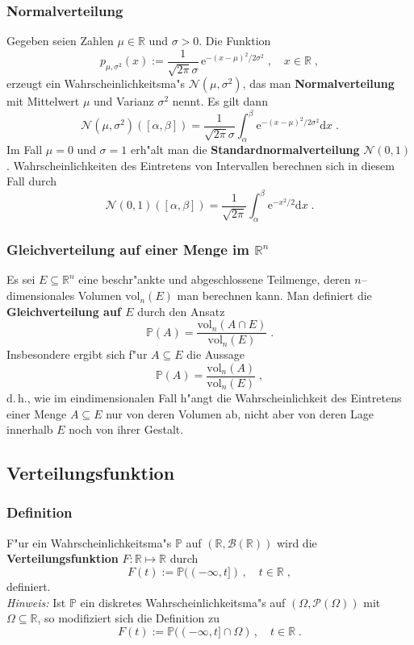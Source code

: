 \documentclass[ngerman,draft,parskip=half,twoside]{scrartcl}
\newcommand*{\R}{\mathbb{R}}      %
\newcommand*{\BorelM}{\mathcal{B}}  %
\newcommand*{\PotM}{\mathcal{P}}    %
\newcommand*{\WKM}{\mathbb{P}}      %
\begin{document}
\subsubsection{Normalverteilung}
Gegeben seien Zahlen $\mu\in\R$ und $\sigma>0$. Die
Funktion
$$
p_{\mu,\sigma^2}(x):= \frac{1}{\sqrt{2\pi}\sigma}\,\mathrm e^{-(x-\mu)^2/2\sigma^2}\;,
\quad x\in\R\;,
$$
erzeugt ein Wahrscheinlichkeitsma"s $\mathcal N(\mu,\sigma^2)$, das
man \textbf{Normalverteilung} mit Mittelwert $\mu$ und Varianz $\sigma^2$ nennt. Es gilt dann
$$
\mathcal N(\mu,\sigma^2)([\alpha,\beta])=\frac{1}{\sqrt{2\pi}\sigma}
\int_\alpha^\beta \mathrm e^{-(x-\mu)^2/2\sigma^2}\mathrm dx\;.
$$
Im Fall $\mu=0$ und $\sigma=1$ erh"alt man die \textbf{Standardnormalverteilung}
$\mathcal N(0,1)$ . Wahrscheinlichkeiten des Eintretens von Intervallen berechnen sich in diesem Fall durch
$$
\mathcal N(0,1)([\alpha,\beta])=\frac{1}{\sqrt{2\pi}}
\int_\alpha^\beta \mathrm e^{-x^2/2}\mathrm dx\;.
$$

\subsubsection{Gleichverteilung auf einer Menge im $\R^n$}
Es sei $E\subseteq \R^n$ eine beschr"ankte und abgeschlossene
Teilmenge, deren $n$--dimensionales Volumen $\mathrm{vol}_n(E)$ man
berechnen kann. Man definiert die \textbf{Gleichverteilung auf $E$} durch den Ansatz
$$
\WKM(A)=\frac{\mathrm{vol}_n(A\cap E)}{\mathrm{vol}_n(E)}\;.
$$
Insbesondere ergibt sich f"ur $A\subseteq E$ die Aussage
$$
\WKM(A)=\frac{\mathrm{vol}_n(A)}{\mathrm{vol}_n(E)}\;,
$$
d.\,h., wie im eindimensionalen Fall h"angt die Wahrscheinlichkeit des Eintretens einer Menge $A\subseteq E$
nur von deren Volumen ab, nicht aber von deren Lage innerhalb $E$ noch von ihrer Gestalt.
\subsection{Verteilungsfunktion}
\subsubsection{Definition}
F"ur ein Wahrscheinlichkeitsma"s $\WKM$ auf $(\R,\BorelM(\R))$ wird die
\textbf{Verteilungsfunktion} $F\colon\R\mapsto\R$ durch
\begin{equation}
\label{F0}
F(t):=\WKM((-\infty,t])\,,\quad t\in\R  \;,
\end{equation}
definiert.\\
\textit{Hinweis:} Ist $\WKM$ ein diskretes Wahrscheinlichkeitsma"s auf $(\Omega,\PotM(\Omega))$ mit $\Omega\subseteq\R$,
so modifiziert sich die Definition zu
$$
F(t):=\WKM((-\infty,t]\cap\Omega)\,,\quad t\in\R  \;.
$$
\end{document}
